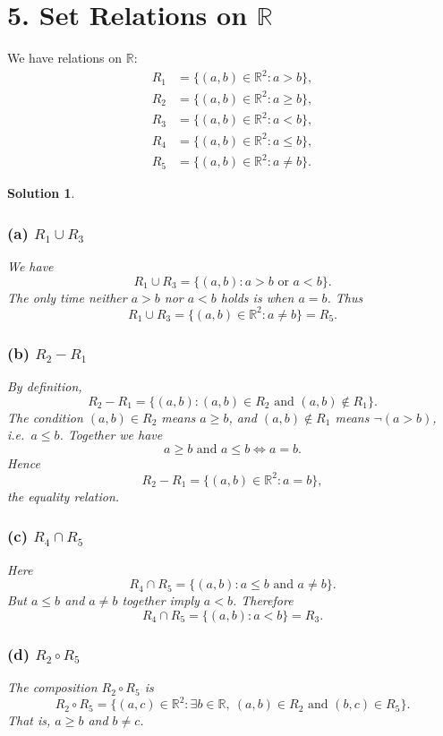 \documentclass[11pt]{article}
\newtheorem*{solution}{Solution}
\begin{document}
\section*{5. Set Relations on $\mathbb{R}$}

We have relations on $\mathbb{R}$:
\begin{align*}
R_1 &= \{(a,b)\in\mathbb{R}^2 : a>b\},\\
R_2 &= \{(a,b)\in\mathbb{R}^2 : a\ge b\},\\
R_3 &= \{(a,b)\in\mathbb{R}^2 : a<b\},\\
R_4 &= \{(a,b)\in\mathbb{R}^2 : a\le b\},\\
R_5 &= \{(a,b)\in\mathbb{R}^2 : a\neq b\}.
\end{align*}

\begin{solution}

\subsubsection*{(a) $R_1 \cup R_3$}
We have
\[
R_1 \cup R_3 = \{(a,b) : a>b \text{ or } a<b\}.
\]
The only time neither $a>b$ nor $a<b$ holds is when $a=b$. Thus
\[
R_1 \cup R_3 = \{(a,b)\in\mathbb{R}^2 : a\neq b\} = R_5.
\]

\subsubsection*{(b) $R_2 - R_1$}
By definition,
\[
R_2 - R_1 = \{(a,b) : (a,b)\in R_2 \text{ and } (a,b)\notin R_1\}.
\]
The condition $(a,b)\in R_2$ means $a\ge b$, and $(a,b)\notin R_1$ means $\neg(a>b)$, i.e.\ $a\le b$. Together we have
\[
a\ge b \text{ and } a\le b \iff a=b.
\]
Hence
\[
R_2 - R_1 = \{(a,b)\in\mathbb{R}^2: a=b\},
\]
the equality relation.

\subsubsection*{(c) $R_4 \cap R_5$}
Here
\[
R_4 \cap R_5 = \{(a,b): a\le b \text{ and } a\neq b\}.
\]
But $a\le b$ and $a\neq b$ together imply $a<b$. Therefore
\[
R_4 \cap R_5 = \{(a,b): a<b\} = R_3.
\]

\subsubsection*{(d) $R_2 \circ R_5$}
The composition $R_2\circ R_5$ is
\[
R_2\circ R_5 = \{(a,c)\in\mathbb{R}^2 : \exists b\in\mathbb{R},\ (a,b)\in R_2 \text{ and } (b,c)\in R_5\}.
\]
That is, $a\ge b$ and $b\neq c$.


\end{solution}
\end{document}
